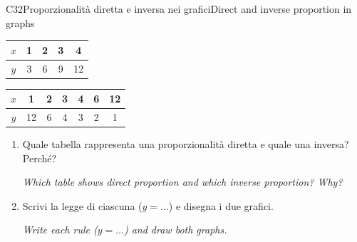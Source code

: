 \documentclass[11pt,a4paper]{article}
\newcommand{\en}[1]{\par{\small\itshape\color{engray}#1\par}}
\begin{document}
\begin{esercizio}{C3}{2}{Proporzionalità diretta e inversa nei grafici}{Direct and inverse proportion in graphs}
\begin{center}
\small
\begin{tabular}{c|cccc}
$x$ & 1 & 2 & 3 & 4\\ \hline
$y$ & 3 & 6 & 9 & 12
\end{tabular}
\qquad\qquad
\begin{tabular}{c|cccccc}
$x$ & 1 & 2 & 3 & 4 & 6 & 12\\ \hline
$y$ & 12 & 6 & 4 & 3 & 2 & 1
\end{tabular}
\end{center}
\begin{enumerate}
\item Quale tabella rappresenta una proporzionalità diretta e quale una inversa? Perché?
\en{Which table shows direct proportion and which inverse proportion? Why?}
\item Scrivi la legge di ciascuna ($y=\dots$) e disegna i due grafici.
\en{Write each rule ($y = \dots$) and draw both graphs.}
\end{enumerate}
\end{esercizio}
\end{document}
